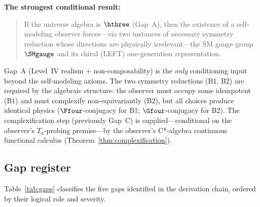 \medskip
\noindent\textbf{The strongest conditional result:}
\begin{quote}
If the universe algebra is $\hthree$ (Gap~A), then the existence of
a self-modeling observer forces---via two instances of necessary
symmetry reduction whose directions are physically irrelevant---the SM
gauge group $\SMgauge$ and its chiral (LEFT) one-generation
representation.
\end{quote}
Gap~A (Level~IV realism $+$ non-composability) is the \emph{only}
conditioning input beyond the self-modeling axioms.  The two
symmetry reductions (B1, B2) are required by the algebraic
structure: the observer must occupy some idempotent (B1) and must
complexify non-equivariantly (B2), but all choices produce identical
physics ($\Ffour$-conjugacy for B1; $\Gfour$-conjugacy for B2).
The complexification step (previously Gap~C) is supplied---conditional on the observer's $T_a$-probing premise---by the
observer's C*-algebra continuous functional calculus
(Theorem~\ref{thm:complexification}).

\subsection{Gap register}\label{sec:gap-register}

Table~\ref{tab:gaps} classifies the five gaps identified in the
derivation chain, ordered by their logical role and severity.

